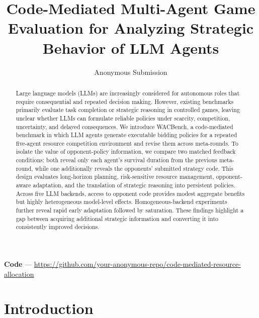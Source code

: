 \documentclass[letterpaper]{article} %
\title{Code-Mediated Multi-Agent Game Evaluation for Analyzing Strategic Behavior of LLM Agents}
\author{Anonymous Submission}
\begin{document}
\maketitle


\begin{abstract}
Large language models (LLMs) are increasingly considered for autonomous roles that require consequential and repeated decision making. However, existing benchmarks primarily evaluate task completion or strategic reasoning in controlled games, leaving unclear whether LLMs can formulate reliable policies under scarcity, competition, uncertainty, and delayed consequences. We introduce WACBench, a code-mediated benchmark in which LLM agents generate executable bidding policies for a repeated five-agent resource competition environment and revise them across meta-rounds. To isolate the value of opponent-policy information, we compare two matched feedback conditions: both reveal only each agent's survival duration from the previous meta-round, while one additionally reveals the opponents' submitted strategy code. This design evaluates long-horizon planning, risk-sensitive resource management, opponent-aware adaptation, and the translation of strategic reasoning into persistent policies. Across five LLM backends, access to opponent code provides modest aggregate benefits but highly heterogeneous model-level effects. Homogeneous-backend experiments further reveal rapid early adaptation followed by saturation. These findings highlight a gap between acquiring additional strategic information and converting it into consistently improved decisions.
\end{abstract}
\noindent\textbf{Code} --- \url{https://github.com/your-anonymous-repo/code-mediated-resource-allocation}



\section{Introduction}
\end{document}
